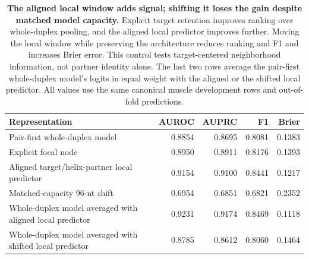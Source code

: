 \begin{table}[H]
\centering
\caption{\textbf{The aligned local window adds signal; shifting it loses the gain despite matched model capacity.} Explicit target retention improves ranking over whole-duplex pooling, and the aligned local predictor improves further. Moving the local window while preserving the architecture reduces ranking and F1 and increases Brier error. This control tests target-centered neighborhood information, not partner identity alone. The last two rows average the pair-first whole-duplex model's logits in equal weight with the aligned or the shifted local predictor. All values use the same canonical muscle development rows and out-of-fold predictions.}\label{tab:targetcontrols}
\begin{tabular}{lrrrr}
\toprule
Representation & AUROC & AUPRC & F1 & Brier \\
\midrule
Pair-first whole-duplex model & 0.8854 & 0.8695 & 0.8081 & 0.1383 \\
Explicit focal node & 0.8950 & 0.8911 & 0.8176 & 0.1393 \\
Aligned target/helix-partner local predictor & 0.9154 & 0.9100 & 0.8441 & 0.1217 \\
Matched-capacity 96-nt shift & 0.6954 & 0.6851 & 0.6821 & 0.2352 \\
Whole-duplex model averaged with aligned local predictor & 0.9231 & 0.9174 & 0.8469 & 0.1118 \\
Whole-duplex model averaged with shifted local predictor & 0.8785 & 0.8612 & 0.8060 & 0.1464 \\
\bottomrule
\end{tabular}
\end{table}
